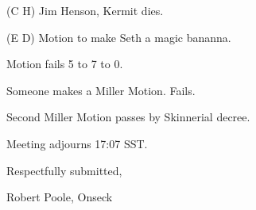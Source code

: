 (C H)  Jim Henson, Kermit dies.

(E D)  Motion to make Seth a magic bananna.

Motion fails 5 to 7 to 0.

Someone makes a Miller Motion.  Fails.

Second Miller Motion passes by Skinnerial decree.

Meeting adjourns 17:07 SST.


\vspace{0.15in}
\begin{center}
Respectfully submitted,

Robert Poole, Onseck
\end{center}


